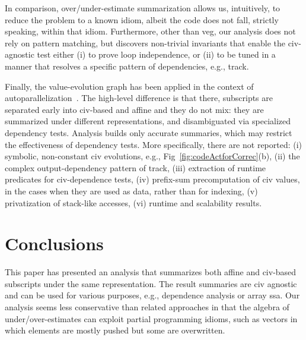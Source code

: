 \documentclass{sig-alternate}
\begin{document}
In comparison, over/under-estimate summarization allows us,
intuitively, to reduce the problem to a known idiom, albeit
the code does not fall, strictly speaking, within that idiom.
Furthermore, other than {\sc veg}, our analysis does not rely
on pattern matching, but discovers non-trivial invariants that
enable the {\sc civ}-agnostic test either (i) to prove loop independence,
or (ii) to be tuned in a manner that resolves a specific pattern 
of dependencies, e.g., {\sc track}.

Finally, the value-evolution graph has been applied in the context of 
autoparallelization~\cite{VEG}.   The high-level difference is that there, 
subscripts are separated early into {\sc civ}-based and affine and they 
do not mix: they are summarized under different representations, 
and disambiguated via specialized dependency tests.
Analysis builds only accurate summaries, which may restrict the
effectiveness of dependency tests. 
More specifically, there are not reported:
  (i)   symbolic, non-constant {\sc civ} evolutions,
        e.g., Fig~\ref{fig:codeActforCorrec}(b),
 (ii) the complex output-dependency pattern of {\sc track},
(iii) extraction of runtime predicates for {\sc civ}-dependence tests,
 (iv) prefix-sum precomputation of {\sc civ} values, in the
        cases when they are used as data, rather than for indexing,
  (v) privatization of stack-like accesses, 
 (vi) runtime and scalability results.


\section{Conclusions}
\label{sec:Concl}

This paper has presented an analysis that summarizes both 
affine and {\sc civ}-based subscripts under the same 
representation. 
%
%
%
The result summaries are {\sc civ} agnostic and can be used for 
various  purposes, e.g., dependence analysis or array {\sc ssa}. 
%
Our analysis seems less conservative than related approaches 
in that the algebra of under/over-estimates can exploit partial 
programming idioms, such as vectors in which elements are mostly 
pushed but some are overwritten. %
\end{document}
